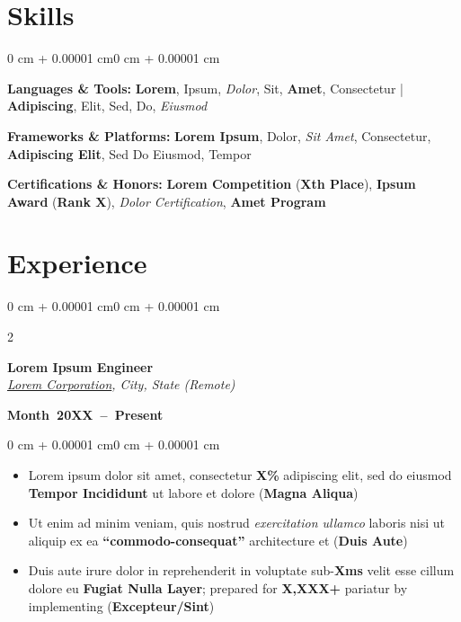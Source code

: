 \documentclass[10pt, letterpaper]{article}
\newenvironment{onecolentry}{
\begin{adjustwidth}{0 cm + 0.00001 cm}{0 cm + 0.00001 cm}
    }{
\end{adjustwidth}
}
\newenvironment{twocolentry}[2][]{
\onecolentry
\def\secondColumn{#2}
\setcolumnwidth{\fill, 5.2 cm}
\begin{paracol}{2}
    }{
    \switchcolumn \raggedleft \secondColumn
\end{paracol}
\endonecolentry
}
\begin{document}
    \section{Skills}
    \begin{onecolentry}
        \begin{itemize}[leftmargin=0cm + 6.5pt, labelsep=5pt]
            \textbf{Languages \& Tools:} \textbf{Lorem}, Ipsum, \textit{Dolor}, Sit, \textbf{Amet}, Consectetur | \textbf{Adipiscing}, Elit, Sed, Do, \textit{Eiusmod}

            \vspace{0.04 cm}
            \textbf{Frameworks \& Platforms:} \textbf{Lorem Ipsum}, Dolor, \textit{Sit Amet}, Consectetur, \textbf{Adipiscing Elit}, Sed Do Eiusmod, Tempor

            \vspace{0.04 cm}
            \textbf{Certifications \& Honors:} \textbf{Lorem Competition} (\textbf{Xth Place}), \textbf{Ipsum Award} (\textbf{Rank X}), \textit{Dolor Certification}, \textbf{Amet Program}
        \end{itemize}
    \end{onecolentry}

    \section{Experience}
    \begin{twocolentry}{\mbox{\textbf{Month~20XX -- Present}}}
        \hspace*{0.1cm} \textbf{Lorem Ipsum Engineer} \\
        \hspace*{0.1cm} \textit{\href{https://example.com}{Lorem Corporation}, City, State (Remote)}
    \end{twocolentry}
    \vspace{0.02 cm}
    \begin{onecolentry}
        \begin{itemize}[leftmargin=0.4cm + 10pt, labelsep=5pt]
            \item Lorem ipsum dolor sit amet, consectetur \textbf{X\%} adipiscing elit, sed do eiusmod \textbf{Tempor Incididunt} ut labore et dolore (\textbf{Magna Aliqua})
            \item Ut enim ad minim veniam, quis nostrud \textit{exercitation ullamco} laboris nisi ut aliquip ex ea \textbf{``commodo-consequat''} architecture et (\textbf{Duis Aute})
            \item Duis aute irure dolor in reprehenderit in voluptate sub-\textbf{Xms} velit esse cillum dolore eu \textbf{Fugiat Nulla Layer}; prepared for \textbf{X,XXX+} pariatur by implementing (\textbf{Excepteur/Sint})
        \end{itemize}
    \end{onecolentry}
\end{document}
